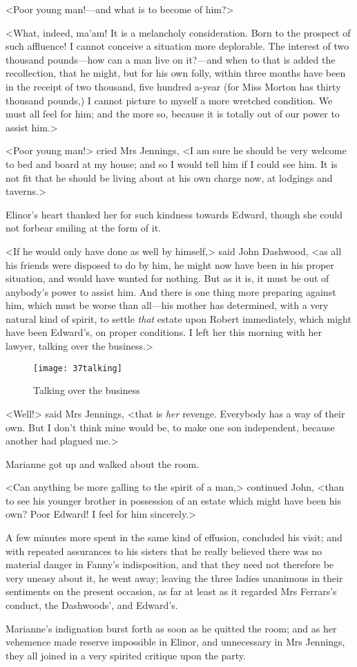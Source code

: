 <Poor young man!—and what is to become of him?>

<What, indeed, ma'am! It is a melancholy consideration. Born to the prospect of such affluence! I cannot conceive a situation more deplorable. The interest of two thousand pounds—how can a man live on it?—and when to that is added the recollection, that he might, but for his own folly, within three months have been in the receipt of two thousand, five hundred a-year (for Miss Morton has thirty thousand pounds,) I cannot picture to myself a more wretched condition. We must all feel for him; and the more so, because it is totally out of our power to assist him.>

<Poor young man!> cried Mrs Jennings, <I am sure he should be very welcome to bed and board at my house; and so I would tell him if I could see him. It is not fit that he should be living about at his own charge now, at lodgings and taverns.>

Elinor's heart thanked her for such kindness towards Edward, though she could not forbear smiling at the form of it.

<If he would only have done as well by himself,> said John Dashwood, <as all his friends were disposed to do by him, he might now have been in his proper situation, and would have wanted for nothing. But as it is, it must be out of anybody's power to assist him. And there is one thing more preparing against him, which must be worse than all—his mother has determined, with a very natural kind of spirit, to settle \textit{that} estate upon Robert immediately, which might have been Edward's, on proper conditions. I left her this morning with her lawyer, talking over the business.>

\begin{figure}[tbph]
\centering
\texttt{[image: 37talking]}
\caption{Talking over the business}
\end{figure}

<Well!> said Mrs Jennings, <that is \textit{her} revenge. Everybody has a way of their own. But I don't think mine would be, to make one son independent, because another had plagued me.>

Marianne got up and walked about the room.

<Can anything be more galling to the spirit of a man,> continued John, <than to see his younger brother in possession of an estate which might have been his own? Poor Edward! I feel for him sincerely.>

A few minutes more spent in the same kind of effusion, concluded his visit; and with repeated assurances to his sisters that he really believed there was no material danger in Fanny's indisposition, and that they need not therefore be very uneasy about it, he went away; leaving the three ladies unanimous in their sentiments on the present occasion, as far at least as it regarded Mrs Ferrars's conduct, the Dashwoods', and Edward's.

Marianne's indignation burst forth as soon as he quitted the room; and as her vehemence made reserve impossible in Elinor, and unnecessary in Mrs Jennings, they all joined in a very spirited critique upon the party.